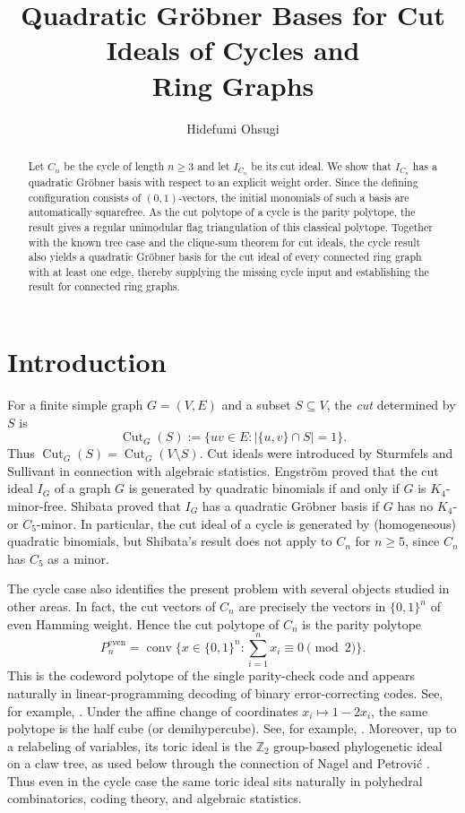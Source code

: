\documentclass[11pt]{amsart}
\title[Quadratic Gr\"obner bases for cycles and ring graphs]
{Quadratic Gr\"obner Bases for Cut Ideals of Cycles and\\ Ring Graphs}
\author{Hidefumi Ohsugi}
\date{}
\theoremstyle{definition}
\newcommand{\Cut}{\operatorname{Cut}}
\numberwithin{equation}{section}
\begin{document}
\begin{abstract}
Let $C_n$ be the cycle of length $n\ge3$ and let $I_{C_n}$ be its cut ideal.
We show that $I_{C_n}$ has a quadratic Gr\"obner basis with respect to an explicit weight order.
Since the defining configuration consists of $(0,1)$-vectors, the initial monomials of such a basis are automatically squarefree.
As the cut polytope of a cycle is the parity polytope, the result gives a regular unimodular flag triangulation of this classical polytope.
Together with the known tree case and the clique-sum theorem for cut ideals,
the cycle result also yields a quadratic Gr\"obner basis for the cut ideal
of every connected ring graph with at least one edge,
thereby supplying the missing cycle input and establishing the result for connected ring graphs.
\end{abstract}

\maketitle

\section{Introduction}

For a finite simple graph $G=(V,E)$ and a subset $S\subseteq V$, the \emph{cut} determined by $S$ is
\[
 \Cut_G(S):=\{uv\in E: |\{u,v\}\cap S|=1\}.
\]
Thus $\Cut_G(S)=\Cut_G(V\setminus S)$. Cut ideals were introduced by Sturmfels and Sullivant \cite{SturmfelsSullivant2008} in connection with algebraic statistics. 
Engstr\"om \cite{Engstrom2011} proved that the cut ideal $I_G$
of a graph $G$ is generated by quadratic binomials if and only if
$G$ is $K_4$-minor-free.
Shibata \cite[Corollary~2.4]{Shibata2015} proved that $I_G$
has a quadratic Gr\"obner basis if $G$ has no $K_4$- or $C_5$-minor.
In particular, the cut ideal of a cycle is generated by
(homogeneous) quadratic binomials, but Shibata's result does not
apply to $C_n$ for $n\ge5$, since $C_n$ has $C_5$ as a minor.



The cycle case also identifies the present problem with several objects studied in other areas. 
In fact, the cut vectors of $C_n$ are precisely the vectors in $\{0,1\}^n$ of even Hamming weight. Hence the cut polytope of $C_n$ is the parity polytope
\[
 P_n^{\mathrm{even}}=\operatorname{conv}\{x\in\{0,1\}^n:\textstyle\sum_{i=1}^n x_i\equiv0\pmod2\}.
\]
This is the codeword polytope of the single parity-check code and appears naturally in linear-programming decoding of binary error-correcting codes.
See, for example, \cite{BarmanLiuDraperRecht2013}. 
Under the affine change of coordinates $x_i\mapsto 1-2x_i$,
the same polytope is the half cube (or demihypercube).
See, for example,  \cite{Green2009}.
Moreover, up to a relabeling of variables, its toric ideal is the $\mathbb Z_2$ group-based phylogenetic ideal on a claw tree, as used below through the connection of Nagel and Petrovi\'c \cite[Lemma~3.1]{NagelPetrovic2009}. Thus even in the cycle case the same toric ideal sits naturally in polyhedral combinatorics, coding theory, and algebraic statistics.
\end{document}

